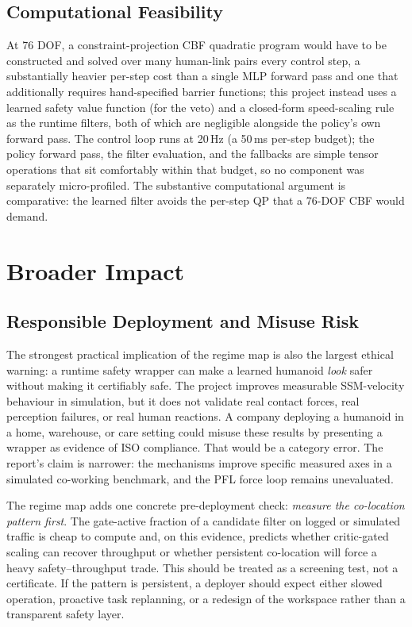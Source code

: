 \documentclass[11pt,a4paper]{report}
\newcommand{\ssm}{SSM}
\newcommand{\pfl}{PFL}
\begin{document}
\subsection{Computational Feasibility}
\label{sec:disc:compute}

At 76 DOF, a constraint-projection CBF quadratic program would have to
be constructed and solved over many human-link pairs every control
step, a substantially heavier per-step cost than a single MLP forward
pass and one that additionally requires hand-specified barrier
functions; this project instead uses a learned safety value function
(for the veto) and a closed-form speed-scaling rule as the runtime
filters, both of which are negligible alongside the policy's own
forward pass. The control loop runs at 20\,Hz (a 50\,ms per-step
budget); the policy forward pass, the filter evaluation, and the
fallbacks are simple tensor operations that sit comfortably within
that budget, so no component was separately micro-profiled. The
substantive computational argument is comparative: the learned
filter avoids the per-step QP that a 76-DOF CBF would demand.

\section{Broader Impact}
\label{sec:disc:broader}

\subsection{Responsible Deployment and Misuse Risk}

The strongest practical implication of the regime map is also the
largest ethical warning: a runtime safety wrapper can make a learned
humanoid \emph{look} safer without making it certifiably safe. The
project improves measurable \ssm{}-velocity behaviour in simulation,
but it does not validate real contact forces, real perception
failures, or real human reactions. A company deploying a humanoid in a
home, warehouse, or care setting could misuse these results by
presenting a wrapper as evidence of ISO compliance. That would be a
category error. The report's claim is narrower: the mechanisms improve
specific measured axes in a simulated co-working benchmark, and the
\pfl{} force loop remains unevaluated.

The regime map adds one concrete pre-deployment check: \emph{measure
the co-location pattern first}. The gate-active fraction of a candidate
filter on logged or simulated traffic is cheap to compute and, on this
evidence, predicts whether critic-gated scaling can recover throughput
or whether persistent co-location will force a heavy safety--throughput
trade. This should be treated as a screening test, not a certificate.
If the pattern is persistent, a deployer should expect either slowed
operation, proactive task replanning, or a redesign of the workspace
rather than a transparent safety layer.
\end{document}
